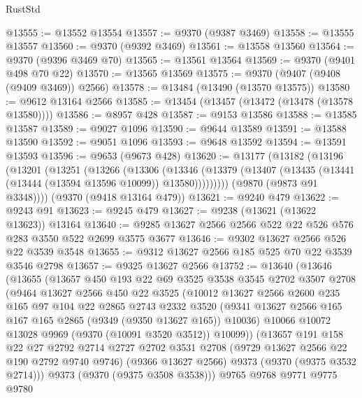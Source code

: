 \begin{lexlean}{RustStd}
\begin{coremodule}
{\begin{coremodule}
{{{{{{{{{{{{{{{{{{{{{{{{{{{{{{{{{{{{{{{@13555 := @13552 @13554
@13557 := @9370 (@9387 @3469)
@13558 := @13555 @13557
@13560 := @9370 (@9392 @3469)
@13561 := @13558 @13560
@13564 := @9370 (@9396 @3469 @70)
@13565 := @13561 @13564
@13569 := @9370 (@9401 @498 @70 @22)
@13570 := @13565 @13569
@13575 := @9370 (@9407 (@9408 (@9409 @3469)) @2566)
@13578 := @13484 (@13490 (@13570 @13575))
@13580 := @9612 @13164 @2566
@13585 := @13454 (@13457 (@13472 (@13478 (@13578 @13580))))
@13586 := @8957 @428
@13587 := @9153 @13586
@13588 := @13585 @13587
@13589 := @9027 @1096
@13590 := @9644 @13589
@13591 := @13588 @13590
@13592 := @9051 @1096
@13593 := @9648 @13592
@13594 := @13591 @13593
@13596 := @9653 (@9673 @428)
@13620 := @13177
    (@13182
      (@13196
        (@13201
          (@13251
            (@13266
              (@13306
                (@13346
                  (@13379 (@13407 (@13435 (@13441 (@13444 (@13594 @13596 @10099)) @13580)))))))))
        (@9870 (@9873 @91 @3348))))
    (@9370 (@9418 @13164 @479))
@13621 := @9240 @479
@13622 := @9243 @91
@13623 := @9245 @479
@13627 := @9238 (@13621 (@13622 @13623)) @13164
@13640 := @9285 @13627 @2566 @2566 @522 @22 @526 @576 @283 @3550 @522 @2699 @3575 @3677
@13646 := @9302 @13627 @2566 @526 @22 @3539 @3548
@13655 := @9312 @13627 @2566 @185 @525 @70 @22 @3539 @3546 @2798
@13657 := @9325 @13627 @2566
@13752 := @13640
    (@13646
      (@13655
        (@13657
          @450
          @193
          @22
          @69
          @3525
          @3538
          @3545
          @2702
          @3507
          @2708
          (@9464
            @13627
            @2566
            @450
            @22
            @3525
            (@10012
              @13627
              @2566
              @2600
              @235
              @165
              @97
              @104
              @22
              @2865
              @2743
              @2332
              @3520
              (@9341 @13627 @2566 @165 @167 @165 @2865 (@9349 (@9350 @13627 @165)) @10036)
              @10066
              @10072
              @13028
              @9969
              (@9370 (@10091 @3520 @3512))
              @10099))
          (@13657
            @191
            @158
            @22
            @27
            @2792
            @2714
            @2727
            @2702
            @3531
            @2708
            (@9729 @13627 @2566 @22 @190 @2792 @9740 @9746)
            (@9366 @13627 @2566)
            @9373
            (@9370 (@9375 @3532 @2714)))
          @9373
          (@9370 (@9375 @3508 @3538)))
        @9765
        @9768
        @9771
        @9775
        @9780
}}}}}}}}}}}}}}}}}}}}}}}}}}}}}}}}}}}}}}}
\end{coremodule}}
\end{coremodule}
\end{lexlean}
